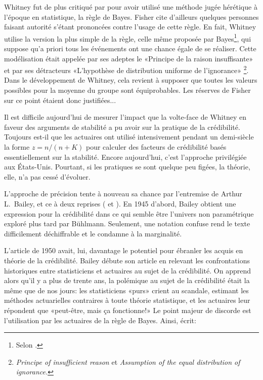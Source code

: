 Whitney fut de plus critiqué par \cite{Fisher:Whitney:discussion:1919}
pour avoir utilisé une méthode jugée hérétique à l'époque en
statistique, la règle de Bayes. Fisher cite d'ailleurs quelques
personnes faisant autorité s'étant prononcées contre l'usage de cette
règle. En fait, Whitney utilise la version la plus simple de la règle,
celle même proposée par Bayes\footnote{%
  Selon \cite{Bailey:1950}.}, %
qui suppose qu'a priori tous les événements ont une chance égale de se
réaliser. Cette modélisation était appelée par ses adeptes le
«Principe de la raison insuffisante» et par ses détracteurs
«L'hypothèse de distribution uniforme de l'ignorance»%
\footnote{\emph{Principe of insufficient reason} et \emph{Assumption
    of the equal distribution of ignorance.}}. %
Dans le développement de Whitney, cela revient à supposer que toutes
les valeurs possibles pour la moyenne du groupe sont équiprobables.
Les réserves de Fisher sur ce point étaient donc justifiées...

Il est difficile aujourd'hui de mesurer l'impact que la volte-face de
Whitney en faveur des arguments de stabilité a pu avoir sur la
pratique de la crédibilité. Toujours est-il que les actuaires ont
utilisé intensivement pendant un demi-siècle la forme $z = n/(n + K)$ pour
calculer des facteurs de crédibilité basés essentiellement sur la
stabilité. Encore aujourd'hui, c'est l'approche privilégiée aux
États-Unis. Pourtant, si les pratiques se sont quelque peu figées, la
théorie, elle, n'a pas cessé d'évoluer.

L'approche de précision tente à nouveau sa chance par l'entremise de
Arthur L.~Bailey, et ce à deux reprises (\cite{Bailey:1945} et
\cite{Bailey:1950}). En 1945 d'abord, Bailey obtient une expression pour
la crédibilité dans ce qui semble être l'univers non paramétrique
exploré plus tard par Bühlmann. Seulement, une notation confuse rend
le texte difficilement déchiffrable et le condamne à la marginalité.

L'article de 1950 avait, lui, davantage le potentiel pour ébranler les
acquis en théorie de la crédibilité. Bailey débute son article en
relevant les confrontations historiques entre statisticiens et
actuaires au sujet de la crédibilité. On apprend alors qu'il y a plus
de trente ans, la polémique au sujet de la crédibilité était la même
que de nos jours: les statisticiens «purs» crient au scandale,
estimant les méthodes actuarielles contraires à toute théorie
statistique, et les actuaires leur répondent que «peut-être, mais ça
fonctionne!» Le point majeur de discorde est l'utilisation par les
actuaires de la règle de Bayes. Ainsi, \cite{Bailey:1950} écrit:

